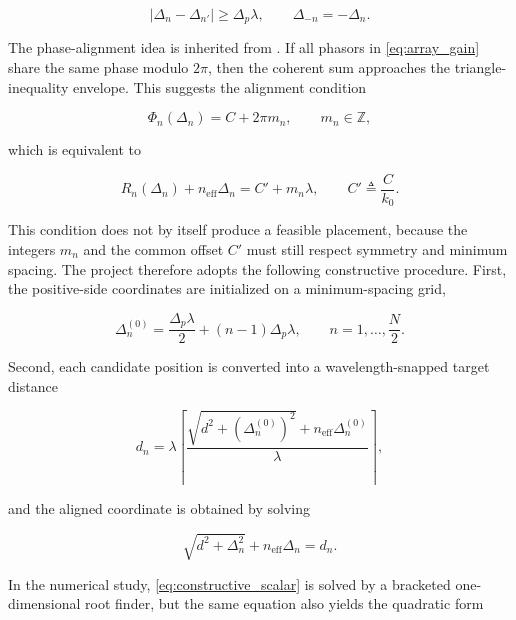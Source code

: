 \begin{equation}
|\Delta_n - \Delta_{n'}| \ge \Delta_p \lambda,
\qquad
\Delta_{-n} = -\Delta_n.
\label{eq:spacing_constraint}
\end{equation}

The phase-alignment idea is inherited from \cite{ouyang2025array}. If all phasors in \eqref{eq:array_gain} share the same phase modulo $2\pi$, then the coherent sum approaches the triangle-inequality envelope. This suggests the alignment condition

\begin{equation}
\Phi_n(\Delta_n) = C + 2 \pi m_n,
\qquad
m_n \in \mathbb{Z},
\label{eq:phase_alignment}
\end{equation}

which is equivalent to

\begin{equation}
R_n(\Delta_n) + n_{\mathrm{eff}} \Delta_n = C' + m_n \lambda,
\qquad
C' \triangleq \frac{C}{k_0}.
\label{eq:phase_alignment_lambda}
\end{equation}

This condition does not by itself produce a feasible placement, because the integers $m_n$ and the common offset $C'$ must still respect symmetry and minimum spacing. The project therefore adopts the following constructive procedure. First, the positive-side coordinates are initialized on a minimum-spacing grid,

\begin{equation}
\Delta_n^{(0)} = \frac{\Delta_p \lambda}{2} + (n-1)\Delta_p \lambda,
\qquad n = 1,\ldots,\frac{N}{2}.
\label{eq:init_grid}
\end{equation}

Second, each candidate position is converted into a wavelength-snapped target distance

\begin{equation}
d_n
= \lambda
\left\lceil
\frac{\sqrt{d^2 + (\Delta_n^{(0)})^2} + n_{\mathrm{eff}}\Delta_n^{(0)}}{\lambda}
\right\rceil,
\label{eq:snapped_target}
\end{equation}

and the aligned coordinate is obtained by solving

\begin{equation}
\sqrt{d^2 + \Delta_n^2} + n_{\mathrm{eff}}\Delta_n = d_n.
\label{eq:constructive_scalar}
\end{equation}

In the numerical study, \eqref{eq:constructive_scalar} is solved by a bracketed one-dimensional root finder, but the same equation also yields the quadratic form

